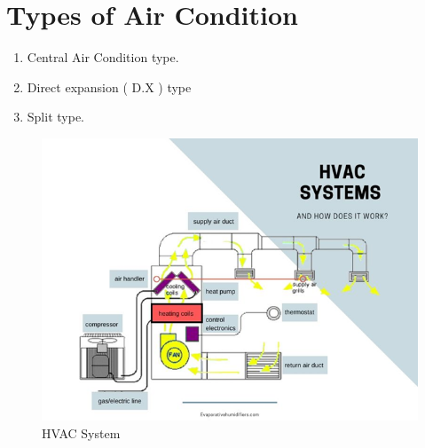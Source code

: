 \documentclass[12pt,fleqn]{book} %
\begin{document}
\section {Types of Air Condition}
\begin{enumerate}
    \item Central Air Condition type.
    \item Direct expansion ( D.X ) type
    \item Split type.
\end{enumerate}
 \begin{figure}[h!]
    \centering
    \includegraphics[width=0.7\linewidth]{h 1.png}
    \caption{HVAC System}
    \label{fig:h 1}
\end{figure} 
\newpage
\end{document}
